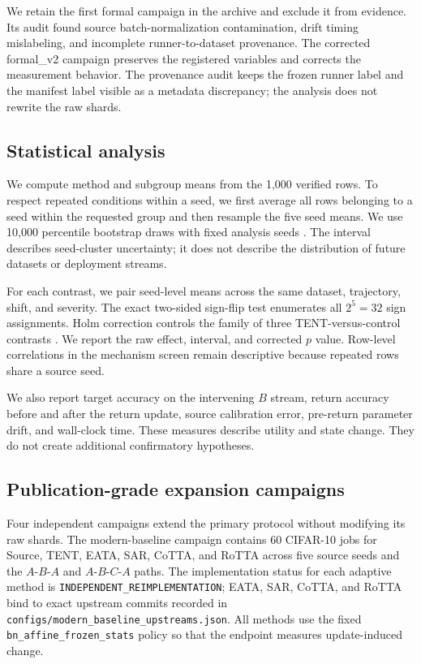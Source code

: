 \documentclass[11pt]{article}
\newcommand{\B}{\ensuremath{B}}
\begin{document}
We retain the first formal campaign in the archive and exclude it from evidence. Its audit found source batch-normalization contamination, drift timing mislabeling, and incomplete runner-to-dataset provenance. The corrected formal\_v2 campaign preserves the registered variables and corrects the measurement behavior. The provenance audit keeps the frozen runner label and the manifest label visible as a metadata discrepancy; the analysis does not rewrite the raw shards.

\subsection{Statistical analysis}
\label{sec:stats}

We compute method and subgroup means from the 1,000 verified rows. To respect repeated conditions within a seed, we first average all rows belonging to a seed within the requested group and then resample the five seed means. We use 10,000 percentile bootstrap draws with fixed analysis seeds \citep{bootstrap}. The interval describes seed-cluster uncertainty; it does not describe the distribution of future datasets or deployment streams.

For each contrast, we pair seed-level means across the same dataset, trajectory, shift, and severity. The exact two-sided sign-flip test enumerates all $2^5=32$ sign assignments. Holm correction controls the family of three TENT-versus-control contrasts \citep{holm}. We report the raw effect, interval, and corrected $p$ value. Row-level correlations in the mechanism screen remain descriptive because repeated rows share a source seed.

We also report target accuracy on the intervening $\B$ stream, return accuracy before and after the return update, source calibration error, pre-return parameter drift, and wall-clock time. These measures describe utility and state change. They do not create additional confirmatory hypotheses.

\subsection{Publication-grade expansion campaigns}
\label{sec:expansion-methods}

Four independent campaigns extend the primary protocol without modifying its raw shards. The modern-baseline campaign contains 60 CIFAR-10 jobs for Source, TENT, EATA, SAR, CoTTA, and RoTTA across five source seeds and the $A$-$B$-$A$ and $A$-$B$-$C$-$A$ paths. The implementation status for each adaptive method is \texttt{INDEPENDENT\_REIMPLEMENTATION}; EATA, SAR, CoTTA, and RoTTA bind to exact upstream commits recorded in \texttt{configs/modern\_baseline\_upstreams.json}. All methods use the fixed \texttt{bn\_affine\_frozen\_stats} policy so that the endpoint measures update-induced change.
\end{document}
